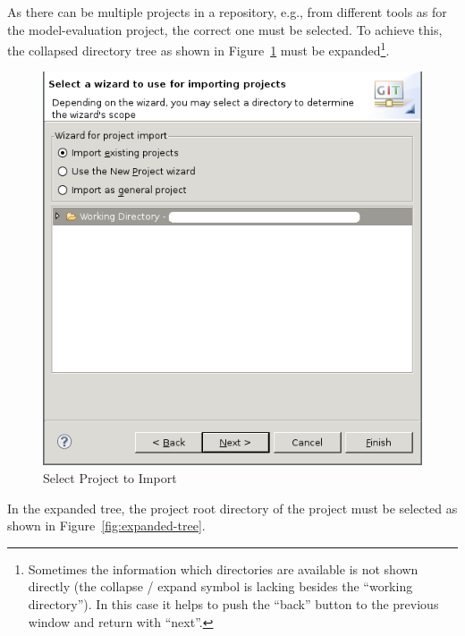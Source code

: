 \documentclass{template/openetcs_article}
\begin{document}
As there can be multiple projects in a repository, e.g., from different tools as
for the model-evaluation project, the correct one must be selected. To achieve
this, the collapsed directory tree as shown in
Figure~\ref{fig:select-project-import} must be expanded\footnote{Sometimes the
  information which directories are available is not shown directly (the
  collapse / expand symbol is lacking besides the ``working directory''). In
  this case it helps to push the ``back'' button to the previous window and
  return with ``next''.}.

\begin{figure}[H]
  \centering
  \includegraphics[width=\skalierung\textwidth]{project_import_step6}
  \caption{Select Project to Import}
  \label{fig:select-project-import}
\end{figure}

In the expanded tree, the project root directory of the project must be selected
as shown in Figure~\ref{fig:expanded-tree}.
\end{document}
